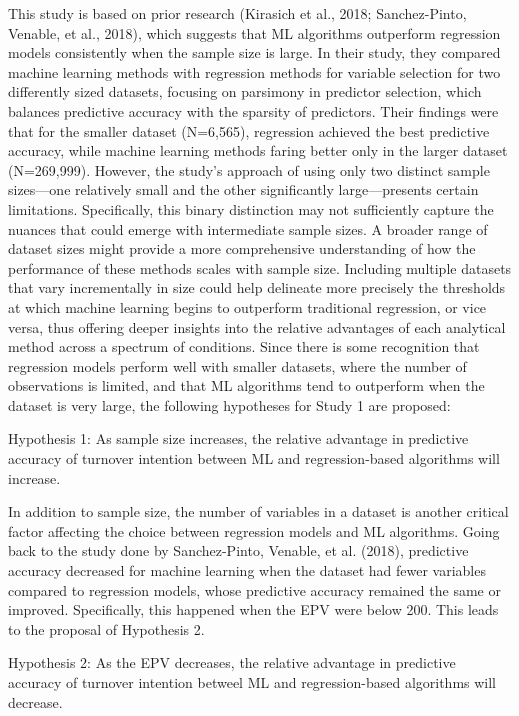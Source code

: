 \documentclass[
  man]{apa7}
\begin{document}
This study is based on prior research (Kirasich et al., 2018; Sanchez-Pinto, Venable, et al., 2018), which suggests that ML algorithms outperform regression models consistently when the sample size is large.
In their study, they compared machine learning methods with regression methods for variable selection for two differently sized datasets, focusing on parsimony in predictor selection, which balances predictive accuracy with the sparsity of predictors.
Their findings were that for the smaller dataset (N=6,565), regression achieved the best predictive accuracy, while machine learning methods faring better only in the larger dataset (N=269,999).
However, the study's approach of using only two distinct sample sizes---one relatively small and the other significantly large---presents certain limitations. Specifically, this binary distinction may not sufficiently capture the nuances that could emerge with intermediate sample sizes. A broader range of dataset sizes might provide a more comprehensive understanding of how the performance of these methods scales with sample size. Including multiple datasets that vary incrementally in size could help delineate more precisely the thresholds at which machine learning begins to outperform traditional regression, or vice versa, thus offering deeper insights into the relative advantages of each analytical method across a spectrum of conditions.
Since there is some recognition that regression models perform well with smaller datasets, where the number of observations is limited, and that ML algorithms tend to outperform when the dataset is very large, the following hypotheses for Study 1 are proposed:

Hypothesis 1: As sample size increases, the relative advantage in predictive accuracy of turnover intention between ML and regression-based algorithms will increase.

In addition to sample size, the number of variables in a dataset is another critical factor affecting the choice between regression models and ML algorithms.
Going back to the study done by Sanchez-Pinto, Venable, et al. (2018), predictive accuracy decreased for machine learning when the dataset had fewer variables compared to regression models, whose predictive accuracy remained the same or improved.
Specifically, this happened when the EPV were below 200.
This leads to the proposal of Hypothesis 2.

Hypothesis 2: As the EPV decreases, the relative advantage in predictive accuracy of turnover intention betweel ML and regression-based algorithms will decrease.
\end{document}
